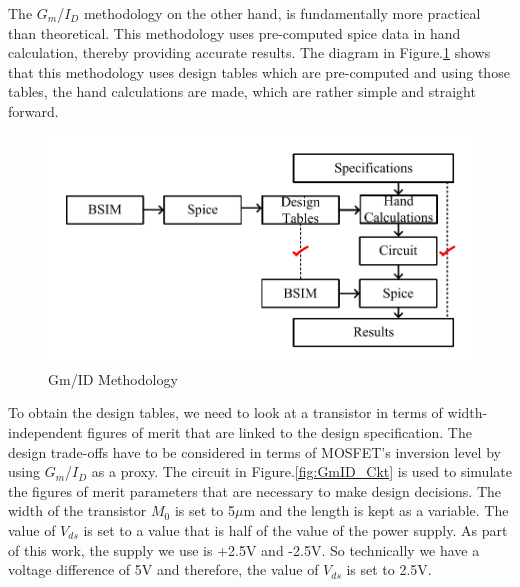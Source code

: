 The $G_m$/$I_D$ methodology on the other hand, is fundamentally more practical than theoretical. This methodology uses pre-computed spice data in hand calculation, thereby providing accurate results. The diagram in Figure.\ref{fig:GmID} shows that this methodology uses design tables which are pre-computed and using those tables, the hand calculations are made, which are rather simple and straight forward. 

\begin{figure} [H]
\centering
\includegraphics[scale=1]{Figures/Misc/PDFs/GmID.pdf}
\caption{Gm/ID Methodology}
\label{fig:GmID}
\end{figure}

To obtain the design tables, we need to look at a transistor in terms of width-independent figures of merit that are linked to the design specification. The design trade-offs have to be considered in terms of MOSFET's inversion level by using $G_m$/$I_D$ as a proxy. The circuit in Figure.\ref{fig:GmID_Ckt} is used to simulate the figures of merit parameters that are necessary to make design decisions. The width of the transistor $M_0$ is set to 5$\mu$m and the length is kept as a variable. The value of $V_{ds}$ is set to a value that is half of the value of the power supply. As part of this work, the supply we use is +2.5V and -2.5V. So technically we have a voltage difference of 5V and therefore, the value of $V_{ds}$ is set to 2.5V.

